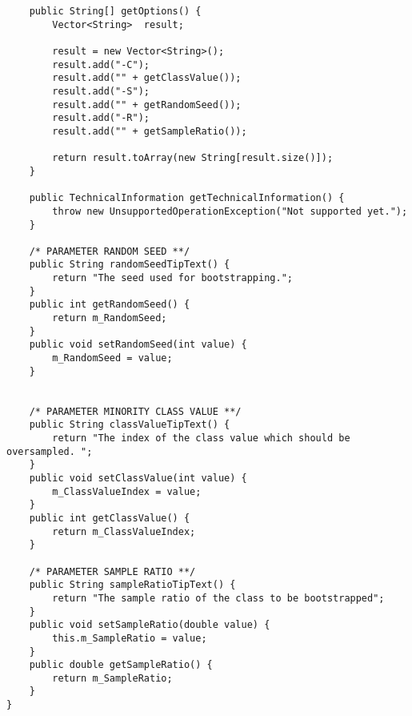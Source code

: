 \begin{lstlisting}
    public String[] getOptions() {
        Vector<String>	result;

        result = new Vector<String>();
        result.add("-C");
        result.add("" + getClassValue());
        result.add("-S");
        result.add("" + getRandomSeed());
        result.add("-R");
        result.add("" + getSampleRatio());

        return result.toArray(new String[result.size()]);
    }

    public TechnicalInformation getTechnicalInformation() {
        throw new UnsupportedOperationException("Not supported yet.");
    }

    /* PARAMETER RANDOM SEED **/
    public String randomSeedTipText() {
        return "The seed used for bootstrapping.";
    }
    public int getRandomSeed() {
        return m_RandomSeed;
    }
    public void setRandomSeed(int value) {
        m_RandomSeed = value;
    }


    /* PARAMETER MINORITY CLASS VALUE **/
    public String classValueTipText() {
        return "The index of the class value which should be oversampled. ";
    }
    public void setClassValue(int value) {
        m_ClassValueIndex = value;
    }
    public int getClassValue() {
        return m_ClassValueIndex;
    }

    /* PARAMETER SAMPLE RATIO **/
    public String sampleRatioTipText() {
        return "The sample ratio of the class to be bootstrapped";
    }
    public void setSampleRatio(double value) {
        this.m_SampleRatio = value;
    }
    public double getSampleRatio() {
        return m_SampleRatio;
    }
}
\end{lstlisting}